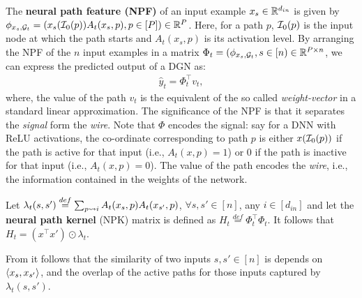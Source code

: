 The \textbf{neural path feature (NPF)} of an input example $x_s\in \mathbb{R}^{d_{in}}$ is given by $\phi_{x_s,\mathcal{G}_t}=(x_s(\mathcal{I}_0(p))A_t(x_s,p) ,p\in[P])\in\mathbb{R}^P$. Here, for a path $p$, $\mathcal{I}_0(p)$ is the input node at which the path starts and $A_t(x_s,p)$ is its activation level. By arranging the NPF of the $n$ input examples in a matrix $\Phi_t=(\phi_{x_s,\mathcal{G}_t},s\in[n)\in\mathbb{R}^{P\times n}$, we can express the predicted output of a DGN as: 
\begin{align}\label{eq:npfbasic}
\hat{y}_t=\Phi_t^\top v_t,
\end{align}
where, the value of the path $v_t$ is the equivalent of the so called \emph{weight-vector} in a standard linear approximation. 
The significance of the NPF is that it separates the \emph{signal} form the \emph{wire}. Note that $\Phi$ encodes the signal: say for a DNN with ReLU activations, the co-ordinate corresponding to path $p$ is either $x(\mathcal{I}_0(p))$ if the path is active for that input (i.e., $A_t(x,p)=1$) or $0$ if the path is inactive for that input  (i.e., $A_t(x,p)=0$). The value of the path encodes the \emph{wire}, i.e., the information contained in the weights of the network.
\begin{lemma}\label{lm:npk}
Let $\lambda_t(s,s')\stackrel{def}{=}\sum_{p\rightsquigarrow i} A_t(x_s,p) A_t(x_{s'},p)$, $\forall s,s'\in[n]$, any $i\in [d_{in}]$ and let the \textbf{neural path kernel} (NPK) matrix is defined as $H_t\stackrel{def}=\Phi^\top_t\Phi_t$. It follows that $H_t= (x^\top x')\odot\lambda_t$. 
\end{lemma}
From  it follows that the similarity of two inputs $s,s'\in[n]$ is depends on $\langle x_s,x_{s'}\rangle$, and the overlap of the active paths for those inputs captured by $\lambda_t(s,s')$.\\

